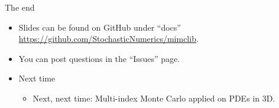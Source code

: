 \begin{frame}{The end}
  \begin{itemize}
  \item Slides can be found on GitHub under {``docs''}
    \url{https://github.com/StochasticNumerics/mimclib}.
    \item You can post questions in the ``Issues'' page.
  \item Next time
    \begin{itemize}
    \item Next, next time: Multi-index Monte Carlo applied on PDEs in
      3D.
    \end{itemize}
  \end{itemize}
\end{frame}










